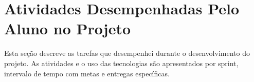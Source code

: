 \section[Atividades Desempenhadas Pelo Aluno no Projeto]{Atividades Desempenhadas Pelo Aluno no Projeto}

Esta seção descreve as tarefas que desempenhei durante o desenvolvimento do
projeto. As atividades e o uso das tecnologias são apresentados por sprint,
intervalo de tempo com metas e entregas específicas.






